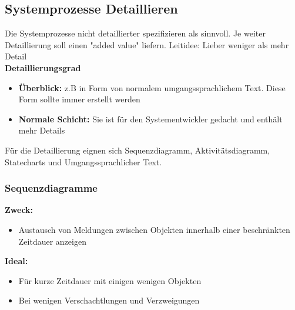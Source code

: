\subsection{Systemprozesse Detaillieren }
Die Systemprozesse nicht detaillierter spezifizieren als sinnvoll. Je weiter Detaillierung soll einen "added value" liefern. 
Leitidee: Lieber weniger als mehr Detail\\

\textbf{Detaillierungsgrad}
\begin{itemize}
	\item \textbf{Überblick: } z.B in Form von normalem umgangssprachlichem Text. Diese Form sollte immer erstellt werden
	\item \textbf{Normale Schicht: } Sie ist für den Systementwickler gedacht und enthält mehr Details  
\end{itemize}

Für die Detaillierung eignen sich Sequenzdiagramm, Aktivitätsdiagramm, Statecharts und Umgangssprachlicher Text.

\subsubsection{Sequenzdiagramme }

\begin{multicols}{2}
	\textbf{Zweck:}
	\begin{itemize}
		\item Austausch von Meldungen zwischen Objekten innerhalb einer beschränkten Zeitdauer anzeigen
	\end{itemize}
	\columnbreak
	
	\textbf{Ideal:}
	\begin{itemize}
		\item Für kurze Zeitdauer mit einigen wenigen Objekten
		\item Bei wenigen Verschachtlungen und Verzweigungen
	\end{itemize}
\end{multicols}

